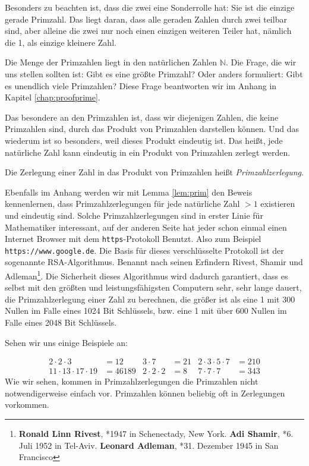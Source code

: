 Besonders zu beachten ist, dass die zwei eine Sonderrolle hat: Sie ist die einzige gerade Primzahl. Das liegt daran, dass alle geraden Zahlen durch zwei teilbar sind, aber alleine die zwei nur noch einen einzigen weiteren Teiler hat, nämlich die 1, als einzige kleinere Zahl.

Die Menge der Primzahlen liegt in den natürlichen Zahlen $\mathbb{N}$. Die Frage, die wir uns stellen sollten ist: Gibt es eine größte Primzahl? Oder anders formuliert: Gibt es unendlich viele Primzahlen? Diese Frage beantworten wir im Anhang in Kapitel \ref{chap:proofprime}.

Das besondere an den Primzahlen ist, dass wir diejenigen Zahlen, die keine Primzahlen sind, durch das Produkt von Primzahlen darstellen können. Und das wiederum ist so besonders, weil dieses Produkt eindeutig ist. Das heißt, jede natürliche Zahl kann eindeutig in ein Produkt von Primzahlen zerlegt werden.

\begin{definition}
Die Zerlegung einer Zahl in das Produkt von Primzahlen heißt \emph{Primzahlzerlegung}.
\end{definition}

Ebenfalls im Anhang werden wir mit Lemma \ref{lem:prim} den Beweis kennenlernen, dass Primzahlzerlegungen für jede natürliche Zahl $>1$ existieren und eindeutig sind. Solche Primzahlzerlegungen sind in erster Linie für Mathematiker interessant, auf der anderen Seite hat jeder schon einmal einen Internet Browser mit dem \texttt{https}-Protokoll Benutzt. Also zum Beispiel \texttt{https://www.google.de}. Die Basis für dieses verschlüsselte Protokoll ist der sogenannte RSA-Algorithmus. Benannt nach seinen Erfindern Rivest, Shamir und Adleman\footnote{\textbf{Ronald Linn Rivest}, *1947 in Schenectady, New York. \textbf{Adi Shamir}, *6. Juli 1952 in Tel-Aviv. \textbf{Leonard Adleman}, *31. Dezember 1945 in San Francisco}. Die Sicherheit dieses Algorithmus wird dadurch garantiert, dass es selbst mit den größten und leistungsfähigsten Computern sehr, sehr lange dauert, die Primzahlzerlegung einer Zahl zu berechnen, die größer ist als eine 1 mit 300 Nullen im Falle eines 1024 Bit Schlüssels, bzw. eine 1 mit über 600 Nullen im Falle eines 2048 Bit Schlüssels.

Sehen wir uns einige Beispiele an: 

\begin{align*}
2\cdot 2\cdot 3 &= 12 & 3\cdot 7 &= 21 & 2\cdot 3\cdot 5\cdot 7 &= 210 \\
11\cdot 13\cdot 17\cdot 19 &= 46189 & 2\cdot 2\cdot 2 &= 8 & 7\cdot 7\cdot 7 &= 343
\end{align*}
Wie wir sehen, kommen in Primzahlzerlegungen die Primzahlen nicht notwendigerweise einfach vor. Primzahlen können beliebig oft in Zerlegungen vorkommen.

